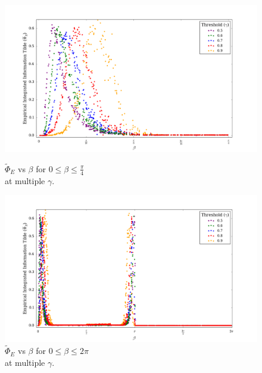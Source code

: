 \documentclass[a4paper,11pt]{article}
\begin{document}
\begin{figure}[H]
\begin{minipage}[b]{0.5\linewidth}
		\begin{center}
		\includegraphics[scale = 0.2]{figures/phi_tilde_vs_beta_orig_multi}
		\caption{
			$\widetilde{\Phi}_E$ vs $\beta$ for $0 \leq \beta \leq \frac{\pi}{4}$\\ at multiple $\gamma$.
			\label{fig:phi-tilde-vs-beta-orig-multi}
		}
		\end{center}
		\vspace{4ex}
	\end{minipage}
	\begin{minipage}[b]{0.5\linewidth}
		\begin{center}
		\includegraphics[scale = 0.2]{figures/phi_tilde_vs_beta_ext_multi}
		\caption{
			$\widetilde{\Phi}_E$ vs $\beta$ for $0 \leq \beta \leq 2\pi$\\ at multiple $\gamma$.
			\label{fig:phi-tilde-vs-beta-ext-multi}
		}
		\end{center}
		\vspace{4ex}
	\end{minipage}
\end{figure}
\end{document}
